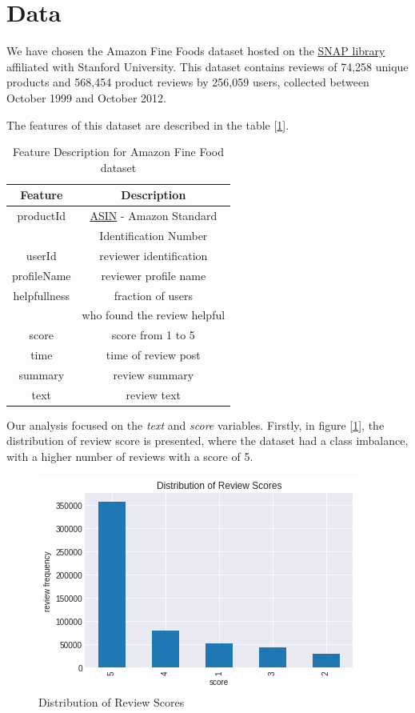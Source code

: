 \documentclass[11pt]{article}
\begin{document}
 \section{Data}
 \label{sec:data}
 We have chosen the Amazon Fine Foods dataset hosted on the \href{https://snap.stanford.edu/about.html}{SNAP library} affiliated with Stanford University. This dataset contains reviews of 74,258 unique products and 568,454 product reviews by 256,059 users, collected between October 1999 and October 2012.
 
 The features of this dataset are described in the table [\ref{feat-description}].
 \begin{table}[h!]
 \scriptsize
    \centering
     \begin{tabular}{c c}
     \hline
          \textbf{Feature} & \textbf{Description}\\ \hline 
     productId &\href{https://en.wikipedia.org/wiki/Amazon_Standard_Identification_Number}{ASIN} - Amazon Standard \\
     & Identification Number\\ 
          userId & reviewer identification \\
          profileName & reviewer profile name\\
          helpfullness & fraction of users\\
          & who found the review helpful\\
          score & score from 1 to 5\\
          time &time of review post\\
          summary&review summary \\ 
          text & review text\\   \hline
     \end{tabular}
     \caption{Feature Description for Amazon Fine Food dataset}
     \label{feat-description}
 \end{table}
 Our analysis focused on the \textit{text} and \textit{score} variables. Firstly, in figure [\ref{fig:review_score_distri}], the distribution of review score is presented, where the dataset had a class imbalance, with a higher number of reviews with a score of 5. 
\begin{figure}[h!]
     \centering
     \includegraphics[scale=0.5]{figures/distribution_review_score.png}
     \caption{Distribution of Review Scores}
     \label{fig:review_score_distri}
 \end{figure}
  
\end{document}
